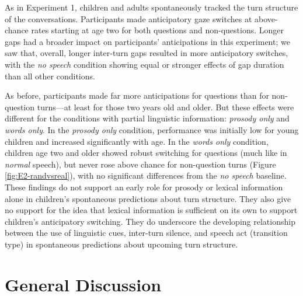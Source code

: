 \documentclass[authoryear, 12pt]{elsarticle}
\begin{document}
As in Experiment 1, children and adults spontaneously tracked the turn structure of the conversations. Participants made anticipatory gaze switches at above-chance rates starting at age two for both questions and non-questions. Longer gaps had a broader impact on participants' anticipations in this experiment; we saw that, overall, longer inter-turn gaps resulted in more anticipatory switches, with the \textit{no speech} condition showing equal or stronger effects of gap duration than all other conditions.

As before, participants made far more anticipations for questions than for non-question turns---at least for those two years old and older. But these effects were different for the conditions with partial linguistic information: \textit{prosody only} and \textit{words only}. In the \textit{prosody only} condition, performance was initially low for young children and increased significantly with age. In the \textit{words only} condition, children age two and older showed robust switching for questions (much like in \textit{normal} speech), but never rose above chance for non-question turns (Figure \ref{fig:E2-randvsreal}), with no significant differences from the \textit{no speech} baseline. These findings do not support an early role for prosody or lexical information alone in children's spontaneous predictions about turn structure. They also give no support for the idea that lexical information is sufficient on its own to support children's anticipatory switching. They do underscore the developing relationship between the use of linguistic cues, inter-turn silence, and speech act (transition type) in spontaneous predictions about upcoming turn structure.

\section*{General Discussion}
\label{sec:gendisc}
\end{document}
